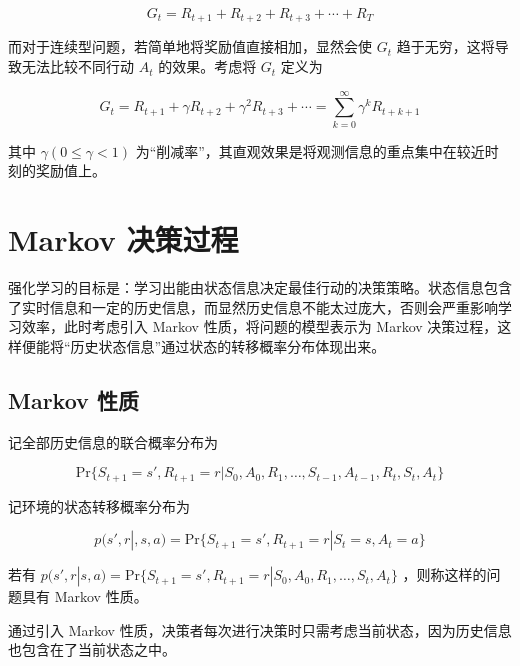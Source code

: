 \begin{equation}
G_t = R_{t+1}+R_{t+2}+R_{t+3}+\cdots+R_T
\end{equation}

而对于连续型问题，若简单地将奖励值直接相加，显然会使 $G_t$ 趋于无穷，这将导致无法比较不同行动 $A_t$ 的效果。考虑将 $G_t$ 定义为

\begin{equation}
G_t = R_{t+1}+\gamma R_{t+2}+\gamma^2 R_{t+3}+\cdots = \sum_{k=0}^{\infty}\gamma^kR_{t+k+1}
\end{equation}

其中 $\gamma(0\leq \gamma < 1)$ 为“削减率”，其直观效果是将观测信息的重点集中在较近时刻的奖励值上。

\section{Markov 决策过程}

强化学习的目标是：学习出能由状态信息决定最佳行动的决策策略\cite{sutton2018reinforcement}。状态信息包含了实时信息和一定的历史信息，而显然历史信息不能太过庞大，否则会严重影响学习效率，此时考虑引入 Markov 性质，将问题的模型表示为 Markov 决策过程\cite{howard1960dynamic}，这样便能将“历史状态信息”通过状态的转移概率分布体现出来\cite{ross1996stochastic}。

\subsection{Markov 性质}

记全部历史信息的联合概率分布为

\begin{equation}
    \mathrm{Pr}\{S_{t+1}=s',R_{t+1}=r|S_0,A_0,R_1,\ldots,S_{t-1},A_{t-1},R_t,S_t,A_t\}
\end{equation}

记环境的状态转移概率分布为

\begin{equation}
    p(s',r|,s,a) = \mathrm{Pr}\{S_{t+1}=s',R_{t+1}=r|S_t=s,A_t=a\}
\end{equation}

\begin{Definition}
    若有 $p(s',r|s,a) = \mathrm{Pr}\{S_{t+1}=s',R_{t+1}=r|S_0,A_0,R_1,\ldots,S_t,A_t\}$ ，则称这样的问题具有 {\jiacu Markov 性质}。
\end{Definition}

通过引入 Markov 性质，决策者每次进行决策时只需考虑当前状态，因为历史信息也包含在了当前状态之中。

